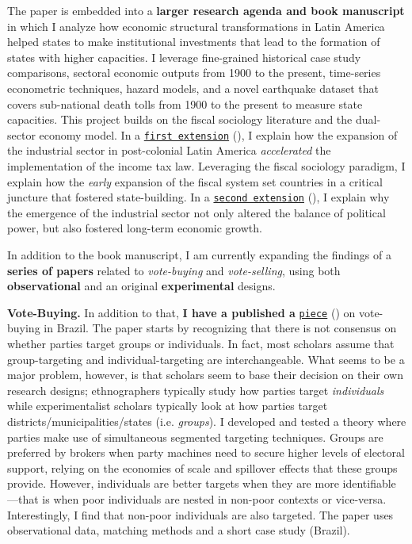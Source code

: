 The paper is embedded into a {\bf larger research agenda and book manuscript} in which I analyze how economic structural transformations in Latin America helped states to make institutional investments that lead to the formation of states with higher capacities. I leverage fine-grained historical case study comparisons, sectoral economic outputs from 1900 to the present, time-series econometric techniques, hazard models, and a novel earthquake dataset that covers sub-national death tolls from 1900 to the present to measure state capacities. This project builds on the fiscal sociology literature and the dual-sector economy model. In a \href{http://github.com/hbahamonde/IncomeTaxAdoption/raw/master/Bahamonde_IncomeTaxAdoption.pdf}{\texttt{first extension}} (\emph{\unskip}), I explain how the expansion of the industrial sector in post-colonial Latin America \emph{accelerated} the implementation of the income tax law. Leveraging the fiscal sociology paradigm, I explain how the \emph{early} expansion of the fiscal system set countries in a critical juncture that fostered state-building. In a \href{https://github.com/hbahamonde/Negative_Link_Paper/raw/master/Bahamonde_NegativeLink.pdf}{\texttt{second extension}} (\emph{\unskip}), I explain why the emergence of the industrial sector not only altered the balance of political power, but also fostered long-term economic growth. 

In addition to the book manuscript, I am currently expanding the findings of a {\bf series of papers} related to \emph{vote-buying} and \emph{vote-selling}, using both {\bf observational} and an original {\bf experimental} designs. 


{\bf Vote-Buying.} In addition to that, {\bf I have a published a} \href{https://github.com/hbahamonde/Clientelism_paper/raw/master/Bahamonde_Clientelism_Paper_Journal.pdf}{\texttt{piece}} (\emph{\unskip}) on vote-buying in Brazil. The paper starts by recognizing that there is not consensus on whether parties target groups or individuals. In fact, most scholars assume that group-targeting and individual-targeting are interchangeable. What seems to be a major problem, however, is that scholars seem to base their decision on their own research designs; ethnographers typically study how parties target \emph{individuals} while experimentalist scholars typically look at how parties target districts/municipalities/states (i.e. \emph{groups}). I developed and tested a theory where parties make use of simultaneous segmented targeting techniques. Groups are preferred by brokers when party machines need to secure higher levels of electoral support, relying on the economies of scale and spillover effects that these groups provide. However, individuals are better targets when they are more identifiable---that is when poor individuals are nested in non-poor contexts or vice-versa. Interestingly, I find that non-poor individuals are also targeted. The paper uses observational data, matching methods and a short case study (Brazil).


